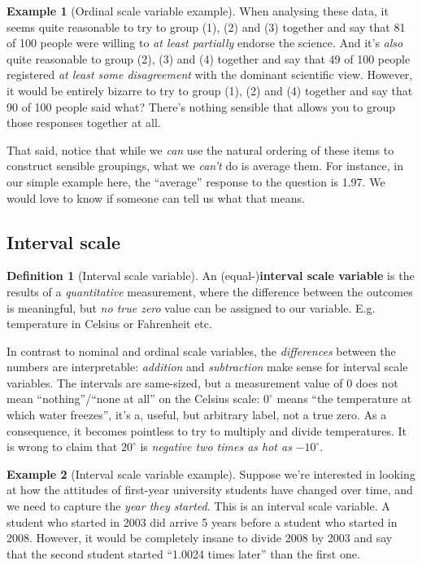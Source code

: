 \documentclass[
  11pt,
]{book}
\theoremstyle{definition}
\newtheorem{definition}{Definition}[chapter]
\theoremstyle{definition}
\newtheorem{example}{Example}[chapter]
\theoremstyle{definition}
\theoremstyle{definition}
\theoremstyle{remark}
\begin{document}
\begin{example}[Ordinal scale variable example]
When analysing these data, it seems quite reasonable to try to group (1), (2) and (3) together and say that 81 of 100 people were willing to \emph{at least partially} endorse the science. And it's \emph{also} quite reasonable to group (2), (3) and (4) together and say that 49 of 100 people registered \emph{at least some disagreement} with the dominant scientific view. However, it would be entirely bizarre to try to group (1), (2) and (4) together and say that 90 of 100 people said what? There's nothing sensible that allows you to group those responses together at all.

That said, notice that while we \emph{can} use the natural ordering of these items to construct sensible groupings, what we \emph{can't} do is average them. For instance, in our simple example here, the ``average'' response to the question is 1.97. We would love to know if someone can tell us what that means.
\end{example}

\hypertarget{intervalscale}{%
\subsection{Interval scale}\label{intervalscale}}

\begin{definition}[Interval scale variable]
\protect\hypertarget{def:definterval}{}\label{def:definterval}An (equal-)\textbf{interval scale variable} is the results of a \emph{quantitative} measurement, where the difference between the outcomes is meaningful, but \emph{no true zero} value can be assigned to our variable. E.g. temperature in Celsius or Fahrenheit etc.
\end{definition}

In contrast to nominal and ordinal scale variables, the \emph{differences} between the numbers are interpretable: \emph{addition} and \emph{subtraction} make sense for interval scale variables. The intervals are same-sized, but a measurement value of 0 does not mean ``nothing''/``none at all'' on the Celsius scale: \(0^\circ\) means ``the temperature at which water freezes'', it's a, useful, but arbitrary label, not a true zero. As a consequence, it becomes pointless to try to multiply and divide temperatures. It is wrong to claim that \(20^\circ\) is \emph{negative two times as hot as} \(-10^\circ\).

\begin{example}[Interval scale variable example]
\protect\hypertarget{exm:exinterval}{}\label{exm:exinterval}Suppose we're interested in looking at how the attitudes of first-year university students have changed over time, and we need to capture the \emph{year they started}. This is an interval scale variable. A student who started in 2003 did arrive 5 years before a student who started in 2008. However, it would be completely insane to divide 2008 by 2003 and say that the second student started ``1.0024 times later'' than the first one.
\end{example}
\end{document}

